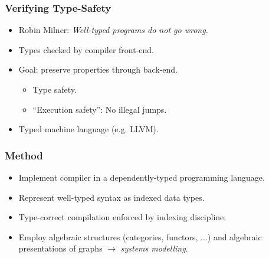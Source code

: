 \documentclass[t,fleqn,usenames,dvipsnames]{beamer}
\newcommand{\cAnn}{\color{red!80!black}}%
\renewcommand{\emph}[1]{{\cAnn#1}}
\newcommand{\cType}{\color{orange!60!black}}
\renewcommand{\emph}[1]{\textit{\cType#1}}
\begin{document}
\begin{frame}%
  \frametitle{Verifying Type-Safety}
  \vspace{-3ex}
  \begin{itemize}
  \item Robin Milner: \emph{Well-typed programs do not go wrong.}
  \item Types checked by compiler front-end.
  \item Goal: preserve properties through back-end.
    \begin{itemize}
    \item Type safety.
    \item ``Execution safety'': No illegal jumps.
    \end{itemize}
  \item Typed machine language (e.g. LLVM).
  \end{itemize}
\end{frame}


\begin{frame}%
  \frametitle{Method}
  \vspace{-3ex}
  \begin{itemize}
  \item Implement compiler in a dependently-typed programming
    language.
  \item Represent well-typed syntax as indexed data types.
  \item Type-correct compilation enforced by indexing discipline.
  \item Employ algebraic structures (categories, functors, ...)
and algebraic presentations of graphs
$\longrightarrow$ \emph{systems modelling}.
  \end{itemize}
\end{frame}
\end{document}
